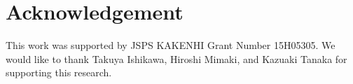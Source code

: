 \documentclass[S,R,E]{article/compsoft}
\begin{document}
\section{Acknowledgement}

This work was supported by JSPS KAKENHI Grant Number 15H05305.
We would like to thank Takuya Ishikawa, Hiroshi Mimaki, and Kazuaki Tanaka for supporting this research.







%
%
\end{document}

